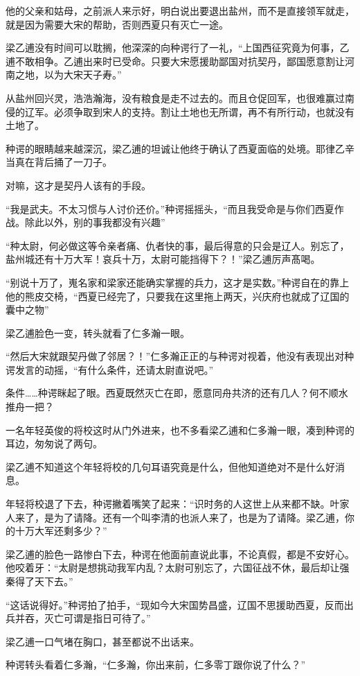 他的父亲和姑母，之前派人来示好，明白说出要退出盐州，而不是直接领军就走，就是因为需要大宋的帮助，否则西夏只有灭亡一途。

梁乙逋没有时间可以耽搁，他深深的向种谔行了一礼，“上国西征究竟为何事，乙逋不敢相争。乙逋出来时已受命。只要大宋愿援助鄙国对抗契丹，鄙国愿意割让河南之地，以为大宋天子寿。”

从盐州回兴灵，浩浩瀚海，没有粮食是走不过去的。而且仓促回军，也很难赢过南侵的辽军。必须争取到宋人的支持。割让土地也无所谓，再不有所行动，也就没有土地了。

种谔的眼睛越来越深沉，梁乙逋的坦诚让他终于确认了西夏面临的处境。耶律乙辛当真在背后捅了一刀子。

对嘛，这才是契丹人该有的手段。

“我是武夫。不太习惯与人讨价还价。”种谔摇摇头，“而且我受命是与你们西夏作战。除此以外，别的事我都没有兴趣”

“种太尉，何必做这等令亲者痛、仇者快的事，最后得意的只会是辽人。别忘了，盐州城还有十万大军！哀兵十万，太尉可能挡得下？！”梁乙逋厉声髙喝。

“别说十万了，嵬名家和梁家还能确实掌握的兵力，这才是实数。”种谔自在的靠上他的熊皮交椅，“西夏已经完了，只要我在这里拖上两天，兴庆府也就成了辽国的囊中之物”

梁乙逋脸色一变，转头就看了仁多瀚一眼。

“然后大宋就跟契丹做了邻居？！”仁多瀚正正的与种谔对视着，他没有表现出对种谔发言的动摇，“有什么条件，还请太尉直说吧。”

条件……种谔眯起了眼。西夏既然灭亡在即，愿意同舟共济的还有几人？何不顺水推舟一把？

一名年轻英俊的将校这时从门外进来，也不多看梁乙逋和仁多瀚一眼，凑到种谔的耳边，匆匆说了两句。

梁乙逋不知道这个年轻将校的几句耳语究竟是什么，但他知道绝对不是什么好消息。

年轻将校退了下去，种谔撇着嘴笑了起来：“识时务的人这世上从来都不缺。叶家人来了，是为了请降。还有一个叫李清的也派人来了，也是为了请降。梁乙逋，你的十万大军还剩多少？”

梁乙逋的脸色一路惨白下去，种谔在他面前直说此事，不论真假，都是不安好心。他咬着牙：“太尉是想挑动我军内乱？太尉可别忘了，六国征战不休，最后却让强秦得了天下去。”

“这话说得好。”种谔拍了拍手，“现如今大宋国势昌盛，辽国不思援助西夏，反而出兵并吞，灭亡可谓是指日可待了。”

梁乙逋一口气堵在胸口，甚至都说不出话来。

种谔转头看着仁多瀚，“仁多瀚，你出来前，仁多零丁跟你说了什么？”

